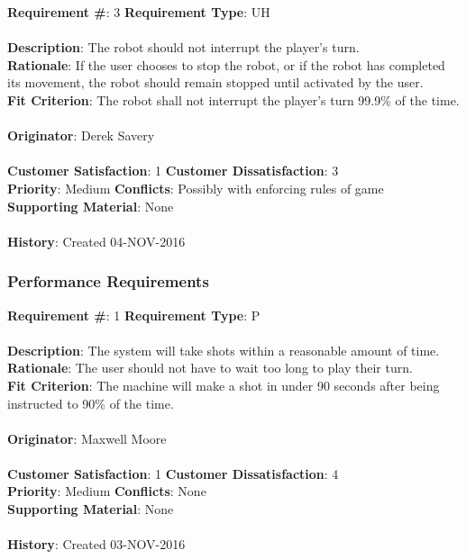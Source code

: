 \documentclass[titlepage]{article}
\begin{document}
\begin{framed}
	\noindent\textbf{Requirement \#}: 3 \hfill \textbf{Requirement Type}: UH \hfill\\\\
	\noindent\textbf{Description}: The robot should not interrupt the player's turn.\\
	\textbf{Rationale}: If the user chooses to stop the robot, or if the robot has completed its movement, the robot should remain stopped until activated by the user.\\
	\textbf{Fit Criterion}: The robot shall not interrupt the player's turn 99.9\% of the time.\\\\
	\textbf{Originator}: Derek Savery\\\\
	\noindent\textbf{Customer Satisfaction}: 1 \hfill 	\textbf{Customer Dissatisfaction}: 3 \hfill\\
	\textbf{Priority}: Medium \hfill \textbf{Conflicts}: Possibly with enforcing rules of game \hfill\\
	\textbf{Supporting Material}: None\\\\
	\noindent\textbf{History}: Created 04-NOV-2016
\end{framed}

\subsubsection{Performance Requirements}
\begin{framed}
	\noindent\textbf{Requirement \#}: 1 \hfill \textbf{Requirement Type}: P\hfill\\\\
	\noindent\textbf{Description}: The system will take shots within a reasonable amount of time.\\
	\textbf{Rationale}: The user should not have to wait too long to play their turn.\\
	\textbf{Fit Criterion}: The machine will make a shot in under 90 seconds after being instructed to 90\% of the time.\\\\
	\textbf{Originator}: Maxwell Moore\\\\
	\noindent\textbf{Customer Satisfaction}: 1 \hfill 	\textbf{Customer Dissatisfaction}: 4 \hfill\\
	\textbf{Priority}: Medium \hfill \textbf{Conflicts}: None \hfill\\
	\textbf{Supporting Material}: None\\\\
	\noindent\textbf{History}: Created 03-NOV-2016
\end{framed}
\end{document}
